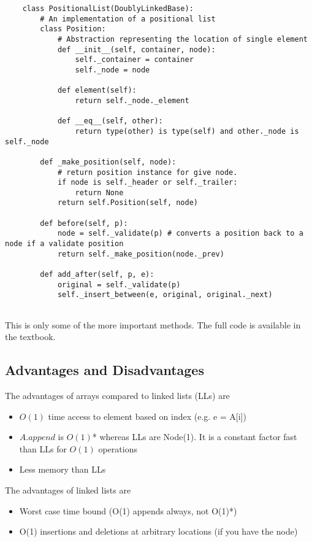\documentclass[]{article}
\begin{document}
\begin{lstlisting}
	class PositionalList(DoublyLinkedBase):
		# An implementation of a positional list
		class Position:
			# Abstraction representing the location of single element
			def __init__(self, container, node):
				self._container = container
				self._node = node
			
			def element(self):
				return self._node._element
				
			def __eq__(self, other):
				return type(other) is type(self) and other._node is self._node
				
		def _make_position(self, node):
			# return position instance for give node.
			if node is self._header or self._trailer:
				return None
			return self.Position(self, node)
		
		def before(self, p):
			node = self._validate(p) # converts a position back to a node if a validate position
			return self._make_position(node._prev)
			
		def add_after(self, p, e):
			original = self._validate(p)
			self._insert_between(e, original, original._next)
			
\end{lstlisting} \bigbreak

This is only some of the more important methods. The full code is available in the textbook.\\

\subsection{Advantages and Disadvantages}\bigbreak

The advantages of arrays compared to linked lists (LLs) are 

\begin{itemize}
	\item $O(1)$ time access to element based on index (e.g. e = A[i])
	\item $A.append$ is $O(1)$* whereas LLs are Node(1). It is a constant factor fast than LLs for $O(1)$ operations
	\item Less memory than LLs
\end{itemize}\bigbreak

The advantages of linked lists are

\begin{itemize}
	\item Worst case time bound (O(1) appends always, not O(1)*)
	\item O(1) insertions and deletions at arbitrary locations (if you have the node)
\end{itemize}\bigbreak
\end{document}
